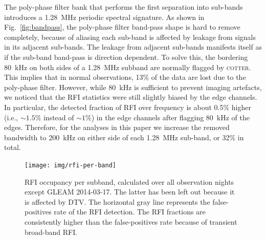 \documentclass{pasa}
\begin{document}
The poly-phase filter bank that performs the first separation into sub-bands introduces a 1.28~MHz periodic spectral signature. As shown in Fig.~\ref{fig:bandpass}, the poly-phase filter band-pass shape is hard to remove completely, because of aliasing each sub-band is affected by leakage from signals in its adjacent sub-bands. The leakage from adjacent sub-bands manifests itself as if the sub-band band-pass is direction dependent. To solve this, the bordering 80~kHz on both sides of a 1.28~MHz subband are normally flagged by \textsc{cotter}. This implies that in normal observations, 13\% of the data are lost due to the poly-phase filter. However, while 80~kHz is sufficient to prevent imaging artefacts, we noticed that the RFI statistics were still slightly biased by the edge channels. In particular, the detected fraction of RFI over frequency is about 0.5\% higher (i.e., $\sim1.5\%$ instead of $\sim1\%$) in the edge channels after flagging 80~kHz of the edges. Therefore, for the analyses in this paper we increase the removed bandwidth to 200~kHz on either side of each 1.28~MHz sub-band, or 32\% in total.
\noindent\begin{figure}
\begin{center}\hspace*{-0.2cm}\texttt{[image: img/rfi-per-band]}
\caption{RFI occupancy per subband, calculated over all observation nights except GLEAM 2014-03-17. The latter has been left out because it is affected by DTV. The horizontal gray line represents the false-positives rate of the RFI detection. The RFI fractions are consistently higher than the false-positives rate because of transient broad-band RFI.}
\label{fig:rfi-per-band}
\end{center}
\end{figure}
\end{document}
